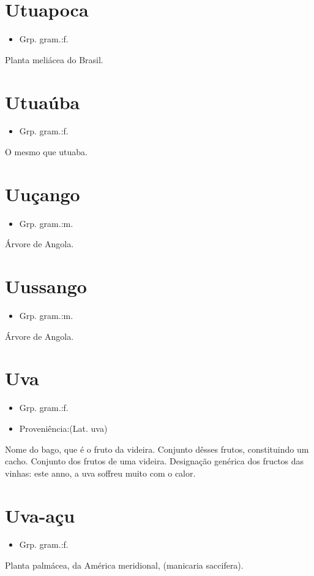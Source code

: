 \documentclass{article}
\begin{document}
\section{Utuapoca}
\begin{itemize}
\item {Grp. gram.:f.}
\end{itemize}
Planta meliácea do Brasil.
\section{Utuaúba}
\begin{itemize}
\item {Grp. gram.:f.}
\end{itemize}
O mesmo que \textunderscore utuaba\textunderscore .
\section{Uuçango}
\begin{itemize}
\item {Grp. gram.:m.}
\end{itemize}
Árvore de Angola.
\section{Uussango}
\begin{itemize}
\item {Grp. gram.:m.}
\end{itemize}
Árvore de Angola.
\section{Uva}
\begin{itemize}
\item {Grp. gram.:f.}
\end{itemize}
\begin{itemize}
\item {Proveniência:(Lat. \textunderscore uva\textunderscore )}
\end{itemize}
Nome do bago, que é o fruto da videira.
Conjunto dêsses frutos, constituindo um cacho.
Conjunto dos frutos de uma videira.
Designação genérica dos fructos das vinhas: \textunderscore este anno, a uva soffreu muito com o calor\textunderscore .
\section{Uva-açu}
\begin{itemize}
\item {Grp. gram.:f.}
\end{itemize}
Planta palmácea, da América meridional, (\textunderscore manicaria saccifera\textunderscore ).
\end{document}
